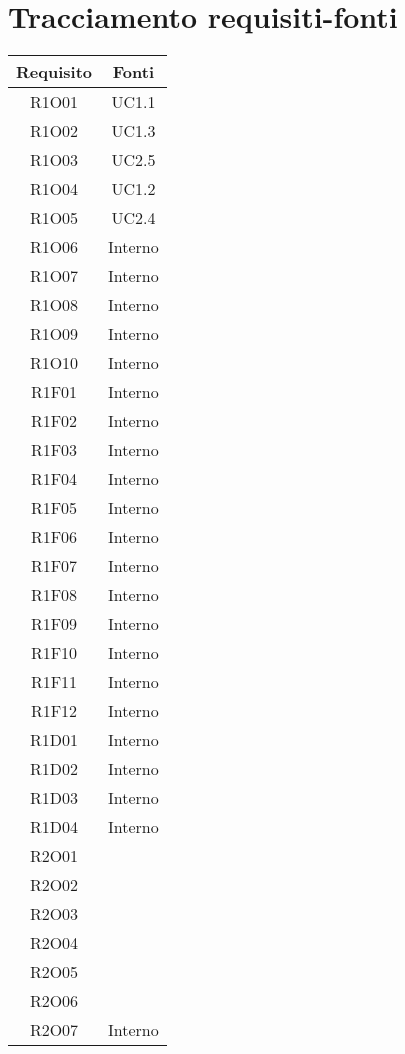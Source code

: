 \section{Tracciamento requisiti-fonti}
\begin{tabularx}{\textwidth}{|C|C|}
	\hline
	\textbf{Requisito} & \textbf{Fonti} \\
	\hline
	\endhead
	R1O01& UC1.1\\
	\hline
	R1O02& UC1.3\\
	\hline
	R1O03& UC2.5\\
	\hline
	R1O04& UC1.2\\
	\hline
	R1O05& UC2.4\\
	\hline
	R1O06& Interno\\
	\hline
	R1O07& Interno\\
	\hline	
	R1O08& Interno\\
	\hline
	R1O09& Interno\\
	\hline	
	R1O10& Interno\\
	\hline
	R1F01& Interno\\
	\hline
	R1F02& Interno\\
	\hline
	R1F03& Interno\\
	\hline
	R1F04& Interno\\
	\hline
	R1F05& Interno\\
	\hline
	R1F06& Interno\\
	\hline
	R1F07& Interno\\
	\hline
	R1F08& Interno\\
	\hline
	R1F09& Interno\\
	\hline
	R1F10& Interno\\
	\hline
	R1F11& Interno\\
	\hline
	R1F12& Interno\\
	\hline
	R1D01& Interno\\
	\hline
	R1D02& Interno\\
	\hline
	R1D03& Interno\\
	\hline
	R1D04& Interno\\
	\hline
	R2O01&\\
	\hline
	R2O02&\\
	\hline
	R2O03&\\
	\hline
	R2O04&\\
	\hline
	R2O05&\\
	\hline
	R2O06&\\
	\hline
	R2O07&Interno\\

\end{tabularx}
